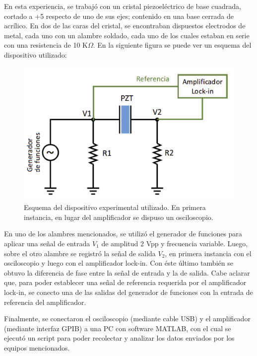 \documentclass[twoside,twocolumn,a4paper]{article}
\begin{document}
En esta experiencia, se trabaj\'o con un cristal piezoel\'ectrico de base cuadrada, cortado a +5 \degree respecto de uno de sus ejes; contenido en una base cerrada de acr\'ilico. En dos de las caras del cristal, se encontraban dispuestos electrodos de metal, cada uno con un alambre soldado, cada uno de los cuales estaban en serie con una resistencia de 10 K$\Omega$. En la siguiente figura se puede ver un esquema del dispositivo utilizado:

\begin{figure}[H]
\includegraphics[width=\linewidth]{dispexp.jpg}
\caption{Esquema del dispositivo experimental utilizado. En primera instancia, en lugar del amplificador se dispuso un osciloscopio.}
\label{fig:dispexp}
\end{figure}

En uno de los alambres mencionados, se utiliz\'o el generador de funciones para aplicar una se\~nal de entrada $V_{1}$ de amplitud 2 Vpp y frecuencia variable. Luego, sobre el otro alambre se registr\'o la se\~nal de salida $V_{2}$, en primera instancia con el osciloscopio y luego con el amplificador lock-in. Con \'este \'ultimo tambi\'en se obtuvo la diferencia de fase entre la se\~nal de entrada y la de salida. Cabe aclarar que, para poder establecer una se\~nal de referencia requerida por el amplificador lock-in, se conecto una de las salidas del generador de funciones con la entrada de referencia del amplificador.


Finalmente, se conectaron el osciloscopio (mediante cable USB) y el amplificador (mediante interfaz GPIB) a una PC con software MATLAB,    con el cual se ejecut\'o un script para poder recolectar y analizar los datos enviados por los equipos mencionados.
\end{document}
